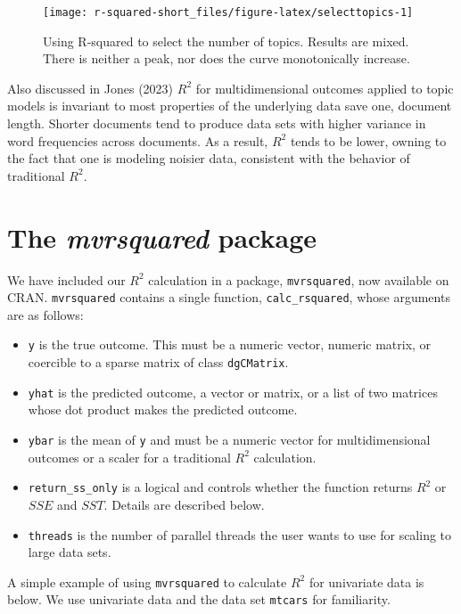 \begin{figure}
\texttt{[image: r-squared-short\_files/figure-latex/selecttopics-1]} \caption{Using R-squared to select the number of topics. Results are mixed. There is neither a peak, nor does the curve monotonically increase.}\label{fig:selecttopics}
\end{figure}

Also discussed in Jones (2023) \(R^2\) for multidimensional outcomes applied to topic models is invariant to most properties of the underlying data save one, document length. Shorter documents tend to produce data sets with higher variance in word frequencies across documents. As a result, \(R^2\) tends to be lower, owning to the fact that one is modeling noisier data, consistent with the behavior of traditional \(R^2\).

\hypertarget{the-mvrsquared-package}{%
\section{\texorpdfstring{The \emph{mvrsquared} package}{The mvrsquared package}}\label{the-mvrsquared-package}}

We have included our \(R^2\) calculation in a package, \texttt{mvrsquared}, now available on CRAN. \texttt{mvrsquared} contains a single function, \texttt{calc\_rsquared}, whose arguments are as follows:

\begin{itemize}
\tightlist
\item
  \texttt{y} is the true outcome. This must be a numeric vector, numeric matrix, or coercible to a sparse matrix of class \texttt{dgCMatrix}.
\item
  \texttt{yhat} is the predicted outcome, a vector or matrix, or a list of two matrices whose dot product makes the predicted outcome.
\item
  \texttt{ybar} is the mean of \texttt{y} and must be a numeric vector for multidimensional outcomes or a scaler for a traditional \(R^2\) calculation.
\item
  \texttt{return\_ss\_only} is a logical and controls whether the function returns \(R^2\) or \(SSE\) and \(SST\). Details are described below.
\item
  \texttt{threads} is the number of parallel threads the user wants to use for scaling to large data sets.
\end{itemize}

A simple example of using \texttt{mvrsquared} to calculate \(R^2\) for univariate data is below. We use univariate data and the data set \texttt{mtcars} for familiarity.

